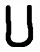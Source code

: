 \documentclass[russian,utf8,emptystyle]{eskdtext}
\begin{document}
\begin{figure}[!htb]
\includegraphics[width=\linewidth]{../data/learn/u/001}
\endminipage\hfill
{}

\end{figure}
\end{document}

